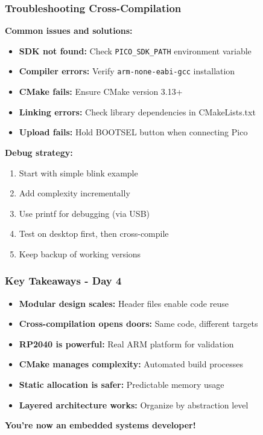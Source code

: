 \documentclass{beamer}
\begin{document}
\begin{frame}
\frametitle{Troubleshooting Cross-Compilation}
\textbf{Common issues and solutions:}

\begin{itemize}
    \item \textbf{SDK not found:} Check \texttt{PICO\_SDK\_PATH} environment variable
    \item \textbf{Compiler errors:} Verify \texttt{arm-none-eabi-gcc} installation
    \item \textbf{CMake fails:} Ensure CMake version 3.13+
    \item \textbf{Linking errors:} Check library dependencies in CMakeLists.txt
    \item \textbf{Upload fails:} Hold BOOTSEL button when connecting Pico
\end{itemize}

\vspace{0.5cm}
\textbf{Debug strategy:}
\begin{enumerate}
    \item Start with simple blink example
    \item Add complexity incrementally
    \item Use printf for debugging (via USB)
    \item Test on desktop first, then cross-compile
    \item Keep backup of working versions
\end{enumerate}
\end{frame}

\begin{frame}
\frametitle{Key Takeaways - Day 4}
\begin{itemize}
    \item \textbf{Modular design scales:} Header files enable code reuse
    \item \textbf{Cross-compilation opens doors:} Same code, different targets
    \item \textbf{RP2040 is powerful:} Real ARM platform for validation
    \item \textbf{CMake manages complexity:} Automated build processes
    \item \textbf{Static allocation is safer:} Predictable memory usage
    \item \textbf{Layered architecture works:} Organize by abstraction level
\end{itemize}

\vspace{0.5cm}
\begin{center}
\textbf{You're now an embedded systems developer!}
\end{center}
\end{frame}
\end{document}
